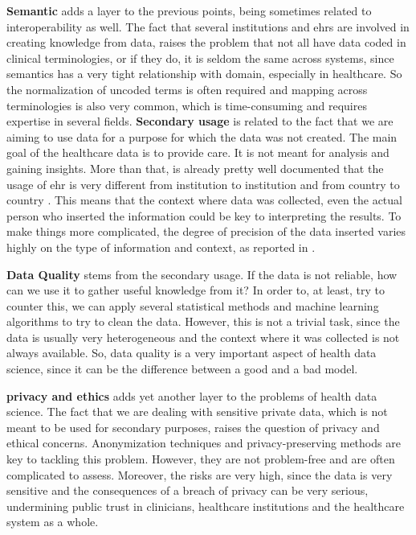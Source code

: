 \textbf{Semantic} adds a layer to the previous points, being sometimes related to interoperability as well. The fact that several institutions and \acp{ehr} are involved in creating knowledge from data, raises the problem that not all have data coded in clinical terminologies, or if they do, it is seldom the same across systems, since semantics has a very tight relationship with domain, especially in healthcare. So the normalization of uncoded terms is often required and mapping across terminologies is also very common, which is time-consuming and requires expertise in several fields.
\textbf{Secondary usage} is related to the fact that we are aiming to use data for a purpose for which the data was not created. The main goal of the healthcare data is to provide care. It is not meant for analysis and gaining insights. More than that, is already pretty well documented that the usage of \ac{ehr} is very different from institution to institution and from country to country \cite{anckerHowElectronicHealth2014,weiskopfMethodsDimensionsElectronic2013a,peekThreeControversiesHealth2018}. This means that the context where data was collected, even the actual person who inserted the information could be key to interpreting the results. To make things more complicated, the degree of precision of the data inserted varies highly on the type of information and context, as reported in \cite{cruz-correiaDataQualityIntegration2009}. 

\textbf{Data Quality} stems from the secondary usage. If the data is not reliable, how can we use it to gather useful knowledge from it? In order to, at least, try to counter this, we can apply several statistical methods and machine learning algorithms to try to clean the data. However, this is not a trivial task, since the data is usually very heterogeneous and the context where it was collected is not always available. So, data quality is a very important aspect of health data science, since it can be the difference between a good and a bad model.


\textbf{privacy and ethics} adds yet another layer to the problems of health data science. The fact that we are dealing with sensitive private data, which is not meant to be used for secondary purposes, raises the question of privacy and ethical concerns. Anonymization techniques and privacy-preserving methods are key to tackling this problem. However, they are not problem-free and are often complicated to assess. Moreover, the risks are very high, since the data is very sensitive and the consequences of a breach of privacy can be very serious, undermining public trust in clinicians, healthcare institutions and the healthcare system as a whole.

